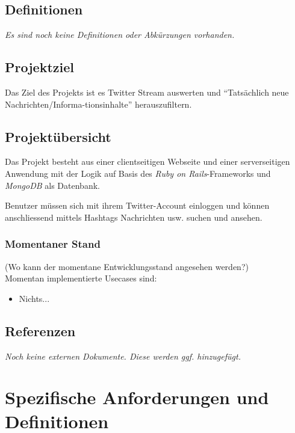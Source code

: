 \documentclass[a4wide]{article}
\begin{document}
\subsection{Definitionen}
\textit{Es sind noch keine Definitionen oder Abk\"urzungen vorhanden.}
\subsection{Projektziel}
Das Ziel des Projekts ist es Twitter Stream auswerten und \enquote{Tats\"achlich neue Nachrichten/Informa-tionsinhalte} herauszufiltern.

\subsection{Projekt\"ubersicht}
Das Projekt besteht aus einer clientseitigen Webseite und einer serverseitigen Anwendung mit der Logik auf Basis des \emph{Ruby on Rails}-Frameworks und \emph{MongoDB} als Datenbank.

Benutzer m\"ussen sich mit ihrem Twitter-Account einloggen und k\"onnen anschliessend mittels Hashtags Nachrichten usw. suchen und ansehen.

\subsubsection{Momentaner Stand}
(Wo kann der momentane Entwicklungsstand angesehen werden?)\\
Momentan implementierte Usecases sind: 
\begin{itemize}
\item Nichts...
\end{itemize}

\subsection{Referenzen}
\textit{Noch keine externen Dokumente. Diese werden ggf. hinzugef\"ugt.}
\section{Spezifische Anforderungen und Definitionen}
\end{document}
